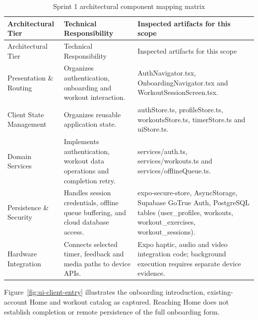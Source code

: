 \documentclass[12pt,a4paper,openany]{report}
\begin{document}
\begingroup
\footnotesize
\setlength{\tabcolsep}{3pt}
\renewcommand{\arraystretch}{1.20}
\setlength{\LTpre}{5pt}
\setlength{\LTpost}{10pt}
\begin{longtable}{|L{3.67cm}|L{5.29cm}|L{5.73cm}|}
\caption{Sprint 1 architectural component mapping matrix}\label{tab:pdf-41-19} \\
\hline
{}
Architectural Tier & Technical Responsibility & Inspected artifacts for this scope \\ \hline
\endfirsthead
\hline
{}
Architectural Tier & Technical Responsibility & Inspected artifacts for this scope \\ \hline
\endhead
Presentation \& Routing & Organizes authentication, onboarding and workout interaction. & AuthNavigator.tsx, OnboardingNavigator.tsx and WorkoutSessionScreen.tsx. \\ \hline
Client State Management & Organizes reusable application state. & authStore.ts, profileStore.ts, workoutsStore.ts, timerStore.ts and uiStore.ts. \\ \hline
Domain Services & Implements authentication, workout data operations and completion retry. & services/auth.ts, services/workouts.ts and services/offlineQueue.ts. \\ \hline
Persistence \& Security & Handles session credentials, offline queue buffering, and cloud database access. & expo-secure-store, AsyncStorage, Supabase GoTrue Auth, PostgreSQL tables (user\_profiles, workouts, workout\_exercises, workout\_sessions). \\ \hline
Hardware Integration & Connects selected timer, feedback and media paths to device APIs. & Expo haptic, audio and video integration code; background execution requires separate device evidence. \\ \hline
\end{longtable}
\endgroup

Figure~\ref{fig:ui-client-entry} illustrates the onboarding introduction, existing-account Home and workout catalog as captured. Reaching Home does not establish completion or remote persistence of the full onboarding form.
\end{document}
